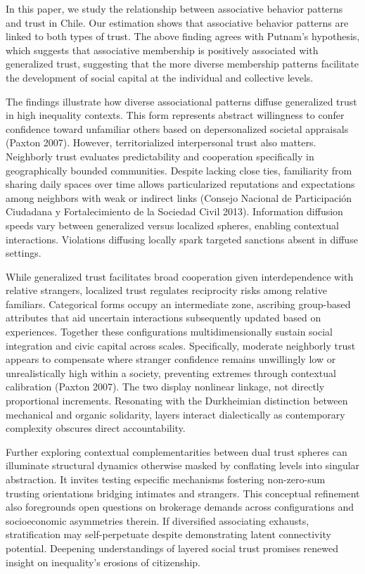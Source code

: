 In this paper, we study the relationship between associative behavior patterns and trust in Chile. Our estimation shows that associative behavior patterns are linked to both types of trust. The above finding agrees with Putnam’s hypothesis, which suggests that associative membership is positively associated with generalized trust, suggesting that the more diverse membership patterns facilitate the development of social capital at the individual and collective levels. 
\bigskip

The findings illustrate how diverse associational patterns diffuse generalized trust in high inequality contexts. This form represents abstract willingness to confer confidence toward unfamiliar others based on depersonalized societal appraisals (Paxton 2007). However, territorialized interpersonal trust also matters. Neighborly trust evaluates predictability and cooperation specifically in geographically bounded communities. Despite lacking close ties, familiarity from sharing daily spaces over time allows particularized reputations and expectations among neighbors with weak or indirect links (Consejo Nacional de Participación Ciudadana y Fortalecimiento de la Sociedad Civil 2013). Information diffusion speeds vary between generalized versus localized spheres, enabling contextual interactions. Violations diffusing locally spark targeted sanctions absent in diffuse settings.
\bigskip

While generalized trust facilitates broad cooperation given interdependence with relative strangers, localized trust regulates reciprocity risks among relative familiars. Categorical forms occupy an intermediate zone, ascribing group-based attributes that aid uncertain interactions subsequently updated based on experiences. Together these configurations multidimensionally sustain social integration and civic capital across scales. Specifically, moderate neighborly trust appears to compensate where stranger confidence remains unwillingly low or unrealistically high within a society, preventing extremes through contextual calibration (Paxton 2007). The two display nonlinear linkage, not directly proportional increments. Resonating with the Durkheimian distinction between mechanical and organic solidarity, layers interact dialectically as contemporary complexity obscures direct accountability.
\bigskip

Further exploring contextual complementarities between dual trust spheres can illuminate structural dynamics otherwise masked by conflating levels into singular abstraction. It invites testing especific mechanisms fostering non-zero-sum trusting orientations bridging intimates and strangers. This conceptual refinement also foregrounds open questions on brokerage demands across configurations and socioeconomic asymmetries therein. If diversified associating exhausts, stratification may self-perpetuate despite demonstrating latent connectivity potential. Deepening understandings of layered social trust promises renewed insight on inequality’s erosions of citizenship.
\bigskip




